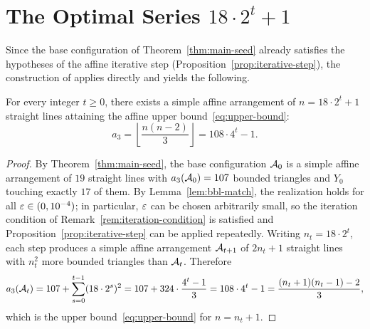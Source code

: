 \section{The Optimal Series \texorpdfstring{$18\cdot 2^t+1$}{18·2ᵗ+1}}\label{sec:series}

Since the base configuration of Theorem~\ref{thm:main-seed} already satisfies
the hypotheses of the affine iterative step
(Proposition~\ref{prop:iterative-step}), the construction of
\cite{bartholdi2007} applies directly and yields the following.

\begin{theorem}\label{thm:straight-series}
For every integer $t\ge 0$, there exists a simple affine arrangement of
$n=18\cdot 2^t+1$ straight lines attaining the affine upper
bound~\eqref{eq:upper-bound}:
\[
  a_3
  =\left\lfloor \frac{n(n-2)}{3}\right\rfloor
  =108\cdot 4^t-1.
\]
\end{theorem}

\begin{proof}
By Theorem~\ref{thm:main-seed}, the base configuration $\mathcal{A}_0$ is a simple
affine arrangement of $19$ straight lines with $a_3(\mathcal{A}_0)=107$ bounded
triangles and $Y_0$ touching exactly $17$ of them. By
Lemma~\ref{lem:bbl-match}, the realization holds for all
$\varepsilon\in(0,10^{-4})$; in particular, $\varepsilon$ can be chosen
arbitrarily small, so the iteration condition of
Remark~\ref{rem:iteration-condition} is satisfied and
Proposition~\ref{prop:iterative-step} can be applied repeatedly. Writing
$n_t=18\cdot 2^t$, each step produces a simple affine arrangement $\mathcal{A}_{t+1}$
of $2n_t+1$ straight lines with $n_t^2$ more bounded triangles than $\mathcal{A}_t$.
Therefore
\[
  a_3(\mathcal{A}_t)
  =107+\sum_{s=0}^{t-1}(18\cdot 2^s)^2
  =107+324\cdot\frac{4^t-1}{3}
  =108\cdot 4^t-1
  =\frac{(n_t+1)(n_t-1)-2}{3},
\]
which is the upper bound~\eqref{eq:upper-bound} for $n=n_t+1$.
\end{proof}

